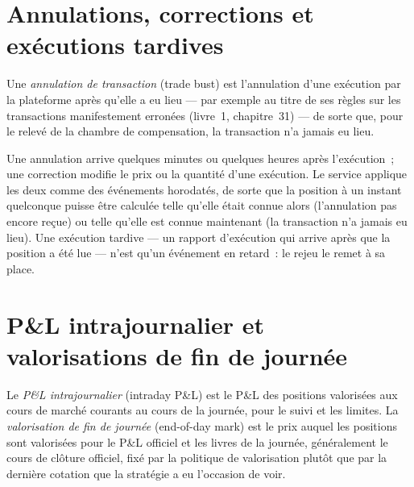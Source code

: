 \label{lst:pl:position-and-pnl-services:status}

\section{Annulations, corrections et exécutions tardives}

\begin{definition}\label{def:pl:position-and-pnl-services:bust}
Une \emph{annulation de transaction} (trade bust) est l'annulation d'une exécution par la plateforme après qu'elle a eu lieu --- par exemple au titre de
ses règles sur les transactions manifestement erronées (livre~1, chapitre~31) --- de sorte que, pour le relevé de la chambre de compensation, la transaction n'a jamais eu lieu.
\end{definition}

Une annulation arrive quelques minutes ou quelques heures après l'exécution~; une correction modifie le prix ou la quantité d'une exécution. Le service applique les deux
comme des événements horodatés, de sorte que la position à un instant quelconque puisse être calculée telle qu'elle était connue alors (l'annulation pas encore reçue)
ou telle qu'elle est connue maintenant (la transaction n'a jamais eu lieu). Une exécution tardive --- un rapport d'exécution qui arrive après que la position a été lue --- n'est qu'un
événement en retard~: le rejeu le remet à sa place.

\section{P\&L intrajournalier et valorisations de fin de journée}

\begin{definition}\label{def:pl:position-and-pnl-services:marks}
Le \emph{P\&L intrajournalier} (intraday P\&L) est le P\&L des positions valorisées aux cours de marché courants au cours de la journée, pour le suivi et les limites.
La \emph{valorisation de fin de journée} (end-of-day mark) est le prix auquel les positions sont valorisées pour le P\&L officiel et les livres de la journée, généralement
le cours de clôture officiel, fixé par la politique de valorisation plutôt que par la dernière cotation que la stratégie a eu l'occasion de voir.
\end{definition}

